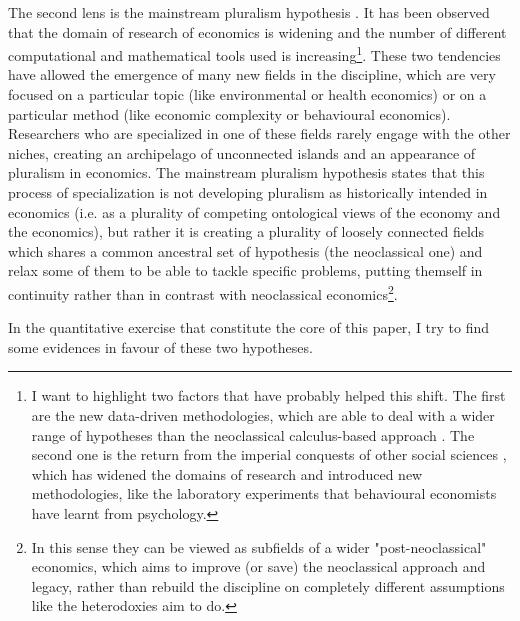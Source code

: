 \documentclass[a4paper, 11pt, headings=standardclasses, tablecaptionsbelow]{scrartcl}
\begin{document}
The second lens is the mainstream pluralism hypothesis \parencite{davis2006,davis2019a,davis2019b,cedrini2018}. It has been observed that the domain of research of economics is widening and the number of different computational and mathematical tools used is increasing\footnote{I want to highlight two factors that have probably helped this shift. The first are the new data-driven methodologies, which are able to deal with a wider range of hypotheses than the neoclassical calculus-based approach \parencite{cherrier2022}. The second one is the return from the imperial conquests of other social sciences \parencite{fourcade2015,marchionatti2017}, which has widened the domains of research and introduced new methodologies, like the laboratory experiments that behavioural economists have learnt from psychology.}. These two tendencies have allowed the emergence of many new fields in the discipline, which are very focused on a particular topic (like environmental or health economics) or on a particular method (like economic complexity or behavioural economics).
Researchers who are specialized in one of these fields rarely engage with the other niches, creating an archipelago of unconnected islands and an appearance of pluralism in economics.
The mainstream pluralism hypothesis states that this process of specialization is not developing pluralism as historically intended in economics (i.e. as a plurality of competing ontological views of the economy and the economics), but rather it is creating a plurality of loosely connected fields which shares a common ancestral set of hypothesis (the neoclassical one) and relax some of them to be able to tackle specific problems, putting themself in continuity rather than in contrast with neoclassical economics\footnote{In this sense they can be viewed as subfields of a wider "post-neoclassical" economics, which aims to improve (or save) the neoclassical approach and legacy, rather than rebuild the discipline on completely different assumptions like the heterodoxies aim to do.}.

In the quantitative exercise that constitute the core of this paper, I try to find some evidences in favour of these two hypotheses.
\end{document}

